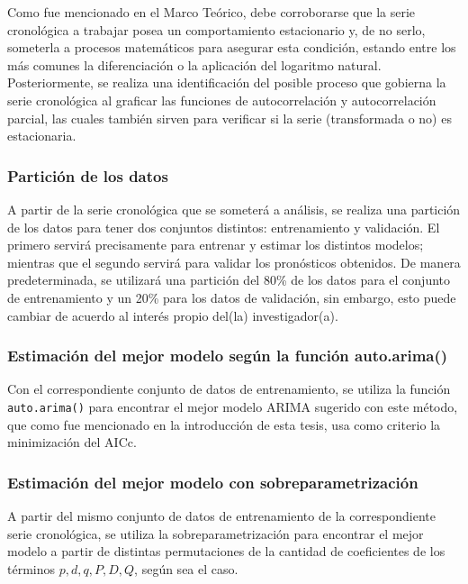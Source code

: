 \documentclass[
]{article}
\begin{document}
Como fue mencionado en el Marco Teórico, debe corroborarse que la serie
cronológica a trabajar posea un comportamiento estacionario y, de no
serlo, someterla a procesos matemáticos para asegurar esta condición,
estando entre los más comunes la diferenciación o la aplicación del
logaritmo natural. Posteriormente, se realiza una identificación del
posible proceso que gobierna la serie cronológica al graficar las
funciones de autocorrelación y autocorrelación parcial, las cuales
también sirven para verificar si la serie (transformada o no) es
estacionaria.

\subsubsection{Partición de los datos}

A partir de la serie cronológica que se someterá a análisis, se realiza
una partición de los datos para tener dos conjuntos distintos:
entrenamiento y validación. El primero servirá precisamente para
entrenar y estimar los distintos modelos; mientras que el segundo
servirá para validar los pronósticos obtenidos. De manera
predeterminada, se utilizará una partición del 80\% de los datos para el
conjunto de entrenamiento y un 20\% para los datos de validación, sin
embargo, esto puede cambiar de acuerdo al interés propio del(la)
investigador(a).

\subsubsection{Estimación del mejor modelo según la función auto.arima()}

Con el correspondiente conjunto de datos de entrenamiento, se utiliza la
función \texttt{auto.arima()} para encontrar el mejor modelo ARIMA
sugerido con este método, que como fue mencionado en la introducción de
esta tesis, usa como criterio la minimización del AICc.

\subsubsection{Estimación del mejor modelo con sobreparametrización}

A partir del mismo conjunto de datos de entrenamiento de la
correspondiente serie cronológica, se utiliza la sobreparametrización
para encontrar el mejor modelo a partir de distintas permutaciones de la
cantidad de coeficientes de los términos \(p,d,q, P,D,Q\), según sea el
caso.
\end{document}
